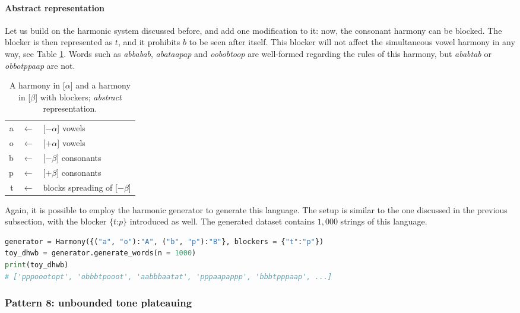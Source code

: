 \paragraph{Abstract representation}

Let us build on the harmonic system discussed before, and add one modification to it: now, the consonant harmony can be blocked.
The blocker is then represented as $t$, and it prohibits $b$ to be seen after itself.
This blocker will not affect the simultaneous vowel harmony in any way, see Table \ref{dhwbmap}.
Words such as \emph{abbabab}, \emph{abataapap} and \emph{oobobtoop} are well-formed regarding the rules of this harmony, but \emph{ababtab} or \emph{obbotppaap} are not.

\begin{table}[h!]
\begin{center}
\begin{tabular}{rcl}
a & $\leftarrow$ & {[}$-\alpha${]} vowels \\
o & $\leftarrow$ & {[}$+\alpha${]} vowels \\
b & $\leftarrow$ & {[}$-\beta${]} consonants \\
p & $\leftarrow$ & {[}$+\beta${]} consonants \\
t & $\leftarrow$ & blocks spreading of {[}$-\beta${]}
\end{tabular}
\end{center}
\caption{A harmony in {[}$\alpha${]} and a harmony in {[}$\beta${]} with blockers; \emph{abstract} representation.}
\label{dhwbmap}
\end{table}

Again, it is possible to employ the harmonic generator to generate this language.
The setup is similar to the one discussed in the previous subsection, with the blocker $\{t$:$p\}$ introduced as well.
The generated dataset contains $1,000$ strings of this language.

\begin{lstlisting}[language=Python]
generator = Harmony({("a", "o"):"A", ("b", "p"):"B"}, blockers = {"t":"p"})
toy_dhwb = generator.generate_words(n = 1000)
print(toy_dhwb)
# ['pppoootopt', 'obbbtpooot', 'aabbbaatat', 'pppaapappp', 'bbbtpppaap', ...]
\end{lstlisting}

\subsubsection{Pattern 8: unbounded tone plateauing}

